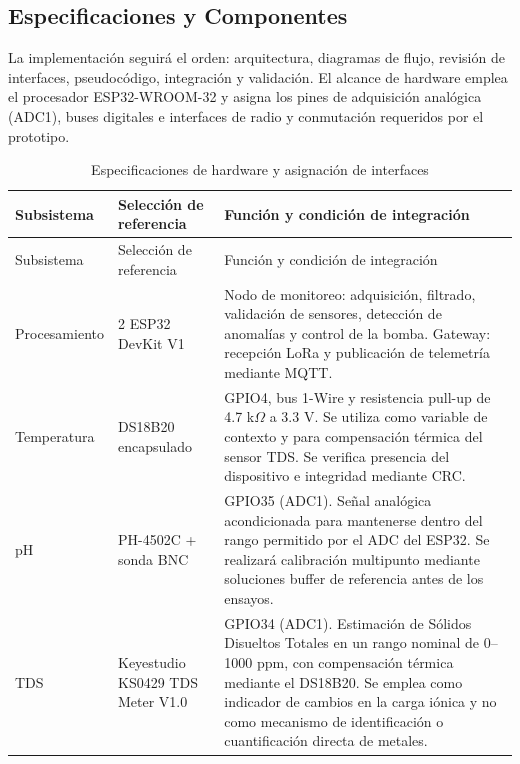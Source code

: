 \documentclass[11pt,a4paper]{article}
\begin{document}
\subsection{Especificaciones y Componentes}

La implementación seguirá el orden: arquitectura, diagramas de flujo, revisión de interfaces, pseudocódigo, integración y validación. El alcance de hardware emplea el procesador ESP32-WROOM-32 \cite{esp32} y asigna los pines de adquisición analógica (ADC1), buses digitales e interfaces de radio y conmutación requeridos por el prototipo.

{\small
\begin{longtable}{p{3.2cm}p{4.1cm}p{7.9cm}}

\caption{Especificaciones de hardware y asignación de interfaces}
\label{tab:componentes} \\

\toprule
Subsistema &
Selección de referencia &
Función y condición de integración \\
\midrule
\endfirsthead

\toprule
Subsistema &
Selección de referencia &
Función y condición de integración \\
\midrule
\endhead

Procesamiento &
2 ESP32 DevKit V1 \cite{esp32} &
Nodo de monitoreo: adquisición, filtrado, validación de sensores, detección de anomalías y control de la bomba. Gateway: recepción LoRa y publicación de telemetría mediante MQTT. \\

Temperatura &
DS18B20 encapsulado \cite{ds18} &
GPIO4, bus 1-Wire y resistencia pull-up de 4.7 k$\Omega$ a 3.3 V. Se utiliza como variable de contexto y para compensación térmica del sensor TDS. Se verifica presencia del dispositivo e integridad mediante CRC. \\

pH &
PH-4502C + sonda BNC &
GPIO35 (ADC1). Señal analógica acondicionada para mantenerse dentro del rango permitido por el ADC del ESP32. Se realizará calibración multipunto mediante soluciones buffer de referencia antes de los ensayos. \\

TDS &
Keyestudio KS0429 TDS Meter V1.0 \cite{tds} &
GPIO34 (ADC1). Estimación de Sólidos Disueltos Totales en un rango nominal de 0--1000 ppm, con compensación térmica mediante el DS18B20. Se emplea como indicador de cambios en la carga iónica y no como mecanismo de identificación o cuantificación directa de metales. \\


\end{longtable}}
\end{document}
